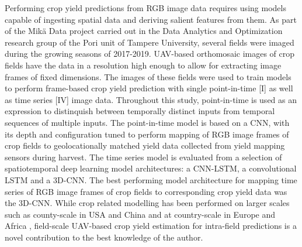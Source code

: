 Performing crop yield predictions from RGB image data requires using models capable of ingesting spatial data and deriving salient features from them. 
As part of the Mikä Data project carried out in the Data Analytics and Optimization research group of the Pori unit of Tampere University, several fields were imaged during the growing seasons of 2017-2019. UAV-based orthomosaic images of crop fields have the data in a resolution high enough to allow for extracting image frames of fixed dimensions.  The images of these fields were used to train models to perform frame-based crop yield prediction with single point-in-time [I] as well as time series [IV] image data. Throughout this study, point-in-time is used as an expression to distinquish between temporally distinct inputs from temporal sequences of multiple inputs. 
The point-in-time model is based on a CNN, with its depth and configuration tuned to perform mapping of RGB image frames of crop fields to geolocationally matched yield data collected from yield mapping sensors during harvest. The time series model is evaluated from a selection of spatiotemporal deep learning model architectures: a CNN-LSTM, a convolutional LSTM and a 3D-CNN. The best performing model architecture for mapping time series of RGB image frames of crop fields to corresponding crop yield data was the 3D-CNN. While crop related modelling has been performed on larger scales such as county-scale in USA \cite{Sun2019} and China \cite{Ji2018} and at country-scale in Europe and Africa \cite{Rustowicz2019}, field-scale UAV-based crop yield estimation for intra-field predictions is a novel contribution to the best knowledge of the author.

